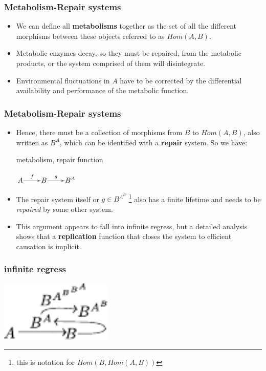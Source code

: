 \begin{frame}
\frametitle{Metabolism-Repair systems}
\begin{itemize}
\item We can define all \textbf{metabolisms} together as the set of all the different morphisms between these objects referred to as $Hom(A,B)$. 
\item Metabolic enzymes decay, so they must be repaired, from the metabolic products, or the system comprised of them will disintegrate. 
\item Environmental fluctuations in $A$ have to be corrected by the differential availability and performance of the metabolic function.
\end{itemize}	
\end{frame}

\begin{frame}

\frametitle{Metabolism-Repair systems}
\begin{itemize}
\item Hence, there must be a collection of morphisms from $B$ to $Hom(A,B)$, also written as $B^A$, which can be identified with a \textbf{repair} system. So we have:

\begin{block}{metabolism, repair function}
\begin{center}
	$
	\xymatrix@1{
	A\ar[r]^f &B\ar[r]^-g & B^A}
	$
\end{center}
\end{block}
\item The repair system itself or $g \in B^{A^B}$ \footnote{this is notation for $Hom(B,Hom(A,B))$} also has a finite lifetime and needs to be {\it repaired} by some other system. 
\item This argument appears to fall into infinite regress, but a detailed analysis shows that a \textbf{replication} function that closes the system to efficient causation is implicit.
\end{itemize}
\end{frame}

\begin{frame}
\frametitle{infinite regress}
	\begin{center}
		\includegraphics[width=0.4\textwidth]{fig/mrcatclose.pdf}
	\end{center}
\end{frame}


